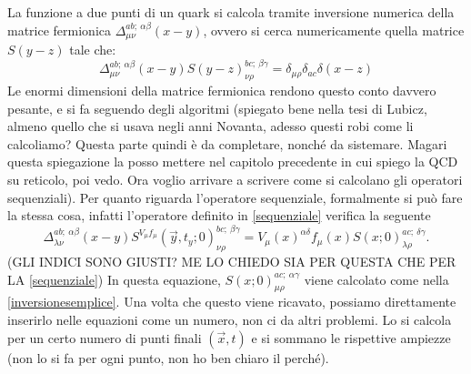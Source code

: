 \documentclass[LaM]{sapthesis}
\begin{document}
	La funzione a due punti di un quark si calcola tramite inversione numerica della matrice fermionica $\Delta_{\mu\nu}^{a b; \ \alpha \beta}(x-y)$, ovvero si cerca numericamente quella matrice $S(y-z)$ tale che:
	\begin{equation}
	\label{inversionesemplice}
		\Delta_{\mu\nu}^{a b; \ \alpha \beta}(x-y) S(y-z)_{\nu\rho}^{b c; \ \beta \gamma}=\delta_{\mu\rho}\delta_{ac}\delta(x-z)
	\end{equation}
	Le enormi dimensioni della matrice fermionica rendono questo conto davvero pesante, e si fa seguendo degli algoritmi (\color{red}spiegato bene nella tesi di Lubicz, almeno quello che si usava negli anni Novanta, adesso questi robi come li calcoliamo? Questa parte quindi è da completare, nonché da sistemare. Magari questa spiegazione la posso mettere nel capitolo precedente in cui spiego la QCD su reticolo, poi vedo. Ora voglio arrivare a scrivere come si calcolano gli operatori sequenziali\color{black}). Per quanto riguarda l'operatore sequenziale, formalmente si può fare la stessa cosa, infatti l'operatore definito in \eqref{sequenziale} verifica la seguente
	\begin{equation}
		\Delta_{\lambda\nu}^{a b; \ \alpha \beta}(x-y)	S^{V_\mu f_\mu}(\vec{y},t_y;0)_{\nu\rho}^{b c; \ \beta \gamma}=V_\mu(x)^{\alpha\delta} f_\mu(x)S(x;0)_{\lambda\rho}^{a c; \ \delta \gamma}.
	\end{equation}
	(\color{red}GLI INDICI SONO GIUSTI? ME LO CHIEDO SIA PER QUESTA CHE PER LA \eqref{sequenziale}\color{black})
	In questa equazione, $S(x;0)_{\mu\rho}^{a c; \ \alpha \gamma}$ viene calcolato come nella \eqref{inversionesemplice}. Una volta che questo viene ricavato, possiamo direttamente inserirlo nelle equazioni come un numero, non ci da altri problemi. Lo si calcola per un certo numero di punti finali $(\vec{x},t)$ e si sommano le rispettive ampiezze (\color{red}non lo si fa per ogni punto, non ho ben chiaro il perché\color{black}).
	
\end{document}
